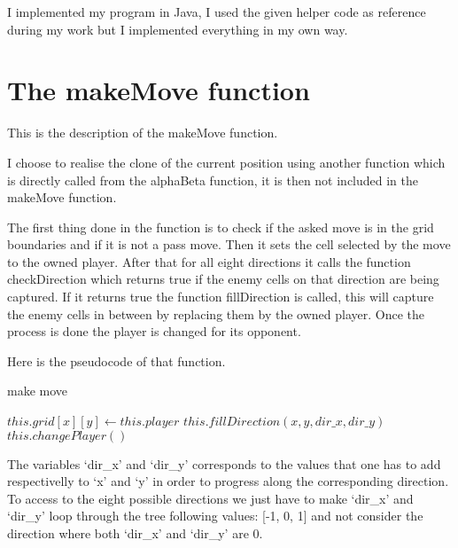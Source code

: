I implemented my program in Java, I used the given helper code as reference during my work but I implemented everything in my own way.

\section{The makeMove function}

This is the description of the makeMove function.

I choose to realise the clone of the current position using another function which is directly called from the alphaBeta function, it is then not included in the makeMove function.

The first thing done in the function is to check if the asked move is in the grid boundaries and if it is not a pass move.
Then it sets the cell selected by the move to the owned player.
After that for all eight directions it calls the function checkDirection which returns true if the enemy cells on that direction are being captured.
If it returns true the function fillDirection is called, this will capture the enemy cells in between by replacing them by the owned player.
Once the process is done the player is changed for its opponent.

Here is the pseudocode of that function.

\FloatBarrier
\begin{algorithm}
    \caption{make move}
    \begin{algorithmic}[1]
                \State $this.grid[x][y] \gets this.player$
                        \State $this.fillDirection(x, y, dir\_x, dir\_y)$
                    \EndIf
                \EndFor
                \State $this.changePlayer()$
            \EndIf
        \EndProcedure
    \end{algorithmic}
\end{algorithm}
\FloatBarrier

The variables `dir\_x' and `dir\_y' corresponds to the values that one has to add respectivelly to `x' and `y' in order to progress along the corresponding direction.
To access to the eight possible directions we just have to make `dir\_x' and `dir\_y' loop through the tree following values: [-1, 0, 1] and not consider the direction where both `dir\_x' and `dir\_y' are 0.

